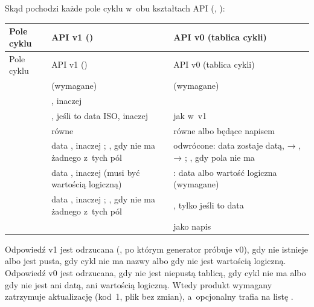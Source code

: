 Skąd pochodzi każde pole cyklu w~obu kształtach API (,
):

\begin{xltabular}{\linewidth}{@{}>{\raggedright\arraybackslash}p{2.6cm} >{\raggedright\arraybackslash}X >{\raggedright\arraybackslash}X@{}}
\toprule
Pole cyklu & API v1 () & API v0 (tablica cykli) \\
\midrule
\endfirsthead
\toprule
Pole cyklu & API v1 () & API v0 (tablica cykli) \\
\midrule
\endhead
{} &  (wymagane) &  (wymagane) \\
 & , inaczej  &  \\
 & , jeśli to data ISO, inaczej  & jak w~v1 \\
 &  równe  &  równe  albo będące napisem \\
 & data , inaczej ; , gdy nie ma żadnego z~tych pól &  odwrócone: data zostaje datą,  → ,  → ; , gdy pola nie ma \\
 & data , inaczej  (musi być wartością logiczną) & : data albo wartość logiczna (wymagane) \\
 & data , inaczej ; , gdy nie ma żadnego z~tych pól & , tylko jeśli to data \\
 &  &  jako napis \\
\bottomrule
\end{xltabular}

Odpowiedź v1 jest odrzucana (, po którym generator próbuje v0),
gdy  nie istnieje albo jest pusta, gdy cykl nie ma nazwy albo gdy
 nie jest wartością logiczną. Odpowiedź v0 jest odrzucana, gdy nie jest
niepustą tablicą, gdy cykl nie ma  albo gdy  nie jest ani datą,
ani wartością logiczną. Wtedy produkt wymagany zatrzymuje aktualizację (kod~1, plik bez
zmian), a~opcjonalny trafia na listę .

